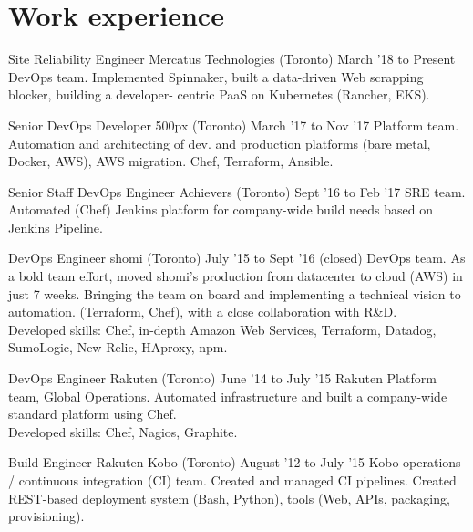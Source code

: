 \documentclass[]{cvpn}
\begin{document}
\section{Work experience}
\begin{eventlist}

\item{Site Reliability Engineer}
     {Mercatus Technologies (Toronto)}
     {March '18 to Present}
{
DevOps team.
Implemented Spinnaker,
built a data-driven Web scrapping blocker,
building a developer- centric PaaS on Kubernetes
(Rancher, EKS).
}

\item{Senior DevOps Developer}
     {500px (Toronto)}
     {March '17 to Nov '17}
{
Platform team.
Automation and architecting of dev.
and production platforms (bare metal, Docker, AWS),
AWS migration. Chef, Terraform, Ansible.
}

\item{Senior Staff DevOps Engineer}
     {Achievers (Toronto)}
     {Sept '16 to Feb '17}
{
SRE team.
Automated (Chef) Jenkins platform for company-wide build
needs based on Jenkins Pipeline.
}

\item{DevOps Engineer}
     {shomi (Toronto)}
     {July '15 to Sept '16 (closed)}
{
DevOps team. As a bold team effort, moved shomi's
production from datacenter to cloud (AWS) in just 7 weeks.
Bringing the team on board and implementing a technical
vision to automation. (Terraform, Chef),
with a close collaboration with R\&D.\\

Developed skills: Chef, in-depth Amazon Web Services,
Terraform, Datadog, SumoLogic, New Relic, HAproxy, npm.
}

\item{DevOps Engineer}
     {Rakuten (Toronto)}
     {June '14 to July '15}
{
Rakuten Platform team, Global Operations.
Automated infrastructure and built a company-wide
standard platform using Chef.\\

Developed skills: Chef, Nagios, Graphite.
}

\item{Build Engineer}
     {Rakuten Kobo (Toronto)}
     {August '12 to July '15}
{
Kobo operations / continuous integration (CI) team.
Created and managed CI pipelines.
Created REST-based deployment system (Bash, Python),
tools (Web, APIs, packaging, provisioning).\\

}
\end{eventlist}
\end{document}
